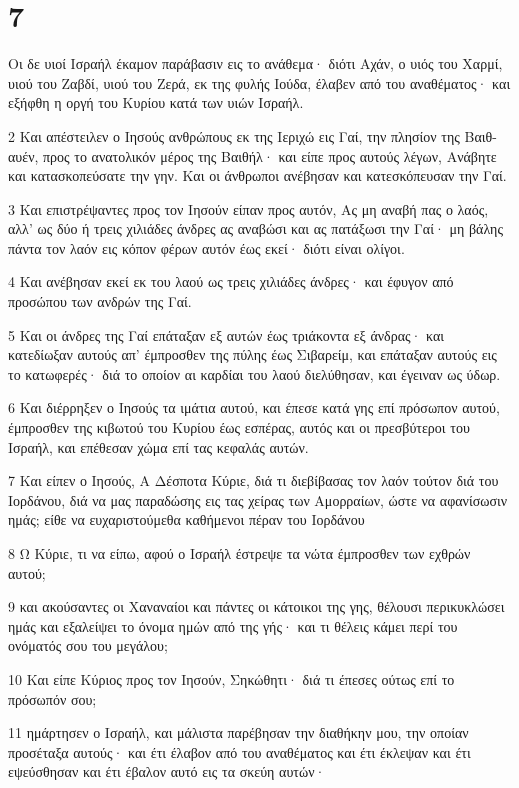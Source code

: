 \chapter{7}

\par Οι δε υιοί Ισραήλ έκαμον παράβασιν εις το ανάθεμα· διότι Αχάν, ο υιός του Χαρμί, υιού του Ζαβδί, υιού του Ζερά, εκ της φυλής Ιούδα, έλαβεν από του αναθέματος· και εξήφθη η οργή του Κυρίου κατά των υιών Ισραήλ.
\par 2 Και απέστειλεν ο Ιησούς ανθρώπους εκ της Ιεριχώ εις Γαί, την πλησίον της Βαιθ-αυέν, προς το ανατολικόν μέρος της Βαιθήλ· και είπε προς αυτούς λέγων, Ανάβητε και κατασκοπεύσατε την γην. Και οι άνθρωποι ανέβησαν και κατεσκόπευσαν την Γαί.
\par 3 Και επιστρέψαντες προς τον Ιησούν είπαν προς αυτόν, Ας μη αναβή πας ο λαός, αλλ' ως δύο ή τρεις χιλιάδες άνδρες ας αναβώσι και ας πατάξωσι την Γαί· μη βάλης πάντα τον λαόν εις κόπον φέρων αυτόν έως εκεί· διότι είναι ολίγοι.
\par 4 Και ανέβησαν εκεί εκ του λαού ως τρεις χιλιάδες άνδρες· και έφυγον από προσώπου των ανδρών της Γαί.
\par 5 Και οι άνδρες της Γαί επάταξαν εξ αυτών έως τριάκοντα εξ άνδρας· και κατεδίωξαν αυτούς απ' έμπροσθεν της πύλης έως Σιβαρείμ, και επάταξαν αυτούς εις το κατωφερές· διά το οποίον αι καρδίαι του λαού διελύθησαν, και έγειναν ως ύδωρ.
\par 6 Και διέρρηξεν ο Ιησούς τα ιμάτια αυτού, και έπεσε κατά γης επί πρόσωπον αυτού, έμπροσθεν της κιβωτού του Κυρίου έως εσπέρας, αυτός και οι πρεσβύτεροι του Ισραήλ, και επέθεσαν χώμα επί τας κεφαλάς αυτών.
\par 7 Και είπεν ο Ιησούς, Α Δέσποτα Κύριε, διά τι διεβίβασας τον λαόν τούτον διά του Ιορδάνου, διά να μας παραδώσης εις τας χείρας των Αμορραίων, ώστε να αφανίσωσιν ημάς; είθε να ευχαριστούμεθα καθήμενοι πέραν του Ιορδάνου
\par 8 Ω Κύριε, τι να είπω, αφού ο Ισραήλ έστρεψε τα νώτα έμπροσθεν των εχθρών αυτού;
\par 9 και ακούσαντες οι Χαναναίοι και πάντες οι κάτοικοι της γης, θέλουσι περικυκλώσει ημάς και εξαλείψει το όνομα ημών από της γής· και τι θέλεις κάμει περί του ονόματός σου του μεγάλου;
\par 10 Και είπε Κύριος προς τον Ιησούν, Σηκώθητι· διά τι έπεσες ούτως επί το πρόσωπόν σου;
\par 11 ημάρτησεν ο Ισραήλ, και μάλιστα παρέβησαν την διαθήκην μου, την οποίαν προσέταξα αυτούς· και έτι έλαβον από του αναθέματος και έτι έκλεψαν και έτι εψεύσθησαν και έτι έβαλον αυτό εις τα σκεύη αυτών·
